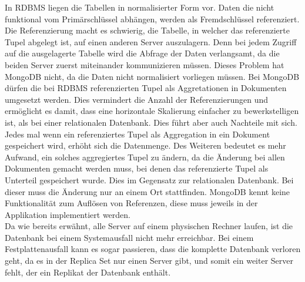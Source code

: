 In RDBMS liegen die Tabellen in normalisierter Form vor. Daten die nicht
 funktional vom Primärschlüssel abhängen, werden als Fremdschlüssel
 referenziert. Die Referenzierung macht es schwierig, die Tabelle, in
 welcher das referenzierte Tupel abgelegt ist, auf einen anderen Server
 auszulagern. Denn bei jedem Zugriff auf die ausgelagerte Tabelle wird die
 Abfrage der Daten verlangsamt, da die beiden Server zuerst miteinander kommunizieren müssen. Dieses Problem hat MongoDB nicht, da die Daten nicht normalisiert
 vorliegen müssen. Bei MongoDB dürfen die bei RDBMS referenzierten Tupel als
 Aggretationen in Dokumenten umgesetzt werden. Dies vermindert die Anzahl der
 Referenzierungen und ermöglicht es damit, dass eine horizontale Skalierung
 einfacher zu bewerkstelligen ist, als bei einer relationalen Datenbank. Dies
 führt aber auch Nachteile mit sich. Jedes mal wenn ein referenziertes
 Tupel als Aggregation in ein Dokument gespeichert wird, erhöht sich die
 Datenmenge. Des Weiteren bedeutet es mehr Aufwand, ein solches aggregiertes
 Tupel zu ändern, da die Änderung bei allen Dokumenten gemacht werden muss, bei denen
 das referenzierte Tupel als Unterteil gespeichert wurde. Dies im Gegensatz zur
 relationalen Datenbank. Bei dieser muss die Änderung nur an einem Ort
 stattfinden. MongoDB kennt keine Funktionalität zum Auflösen von Referenzen, diese muss jeweils in der Applikation implementiert werden. \\
 Da wie bereits erwähnt, alle Server auf einem physischen Rechner
 laufen, ist die Datenbank bei einem Systemausfall nicht mehr erreichbar.
 Bei einem Festplattenausfall kann es sogar passieren, dass die komplette
 Datenbank verloren geht, da es in der Replica Set nur einen Server gibt, und
 somit ein weiter Server fehlt, der ein Replikat der Datenbank enthält.
 